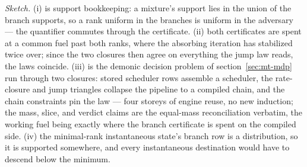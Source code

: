 \emph{Sketch.}  (i) is support bookkeeping: a mixture's support lies
in the union of the branch supports, so a rank uniform in the branches
is uniform in the adversary --- the quantifier commutes through the
certificate.  (ii) both certificates are spent at a common fuel past
both ranks, where the absorbing iteration has stabilized twice over;
since the two closures then agree on everything the jump law reads,
the laws coincide.  (iii) is the demonic decision problem of
section~\ref{sec:mt-mdp} run through two closures: stored scheduler
rows assemble a scheduler, the rate-closure and jump triangles
collapse the pipeline to a compiled chain, and the chain constraints
pin the law --- four storeys of engine reuse, no new induction; the
mass, slice, and verdict claims are the equal-mass reconciliation
verbatim, the working fuel being exactly where the branch certificate
is spent on the compiled side.  (iv) the minimal-rank instantaneous
state's branch row is a distribution, so it is supported somewhere,
and every instantaneous destination would have to descend below the
minimum.

